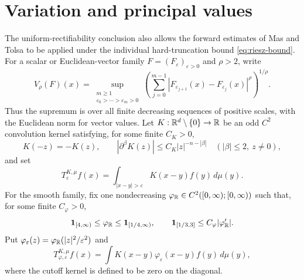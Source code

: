 \section{Variation and principal values}
\label{sec:consequences}

The uniform-rectifiability conclusion also allows the forward estimates
of Mas and Tolsa to be applied under the individual hard-truncation
bound \eqref{eq:riesz-bound}. For a scalar or Euclidean-vector family
$F=(F_\varepsilon)_{\varepsilon>0}$ and $\rho>2$, write
\[
 V_\rho(F)(x)=
 \sup_{\substack{m\ge1\\ \varepsilon_0>\cdots>\varepsilon_m>0}}
 \left(\sum_{j=0}^{m-1}
 |F_{\varepsilon_{j+1}}(x)-F_{\varepsilon_j}(x)|^\rho
 \right)^{1/\rho}.
\]
Thus the supremum is over all finite decreasing sequences of positive
scales, with the Euclidean norm for vector values. Let
$K:\mathbb R^d\setminus\{0\}\to\mathbb R$ be an odd $C^2$ convolution kernel satisfying,
for some finite $C_K>0$,
\begin{equation}\label{eq:variation-kernel}
 K(-z)=-K(z),\qquad
 |\partial^\beta K(z)|\le C_K|z|^{-n-|\beta|}
 \quad (|\beta|\le2,\ z\ne0),
\end{equation}
and set
\[
 T^{K,\mu}_\varepsilon f(x)
 =\int_{|x-y|>\varepsilon}K(x-y)f(y)\,d\mu(y).
\]
For the smooth family, fix one nondecreasing
$\varphi_{\mathbb R}\in C^2([0,\infty);[0,\infty))$ such that, for some finite
$C_\varphi>0$,
\begin{equation}\label{eq:variation-cutoff}
 \mathbf1_{[4,\infty)}\le\varphi_{\mathbb R}
 \le\mathbf1_{[1/4,\infty)},\qquad
 \mathbf1_{[1/3,3]}\le C_\varphi|\varphi_{\mathbb R}'|.
\end{equation}
Put $\varphi_\varepsilon(z)=\varphi_{\mathbb R}(|z|^2/\varepsilon^2)$ and
\[
 T^{K,\mu}_{\varphi,\varepsilon}f(x)
 =\int K(x-y)\varphi_\varepsilon(x-y)f(y)\,d\mu(y),
\]
where the cutoff kernel is defined to be zero on the diagonal.

